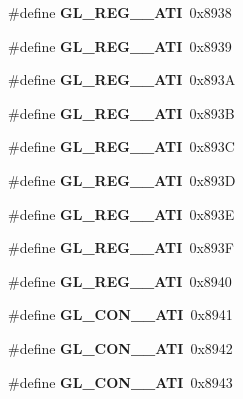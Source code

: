 \begin{DoxyCompactItemize}
\item 
\#define {\bfseries G\+L\+\_\+\+R\+E\+G\+\_\+\_\+\+A\+T\+I}~0x8938\label{_s_d_l__opengl_8h_ae01296918010a0e8a4b507a4cdc7c47d}

\item 
\#define {\bfseries G\+L\+\_\+\+R\+E\+G\+\_\+\_\+\+A\+T\+I}~0x8939\label{_s_d_l__opengl_8h_ad54d4bda4fbc2921b3b6a5edc2f892a5}

\item 
\#define {\bfseries G\+L\+\_\+\+R\+E\+G\+\_\+\_\+\+A\+T\+I}~0x893\+A\label{_s_d_l__opengl_8h_ad2f7149bedb32fce1ad327f3b29abd8a}

\item 
\#define {\bfseries G\+L\+\_\+\+R\+E\+G\+\_\+\_\+\+A\+T\+I}~0x893\+B\label{_s_d_l__opengl_8h_a759fc50e45485d9a429cd78b9d00f6ec}

\item 
\#define {\bfseries G\+L\+\_\+\+R\+E\+G\+\_\+\_\+\+A\+T\+I}~0x893\+C\label{_s_d_l__opengl_8h_a0f69fef5f8fda7c806f9e68c331061e1}

\item 
\#define {\bfseries G\+L\+\_\+\+R\+E\+G\+\_\+\_\+\+A\+T\+I}~0x893\+D\label{_s_d_l__opengl_8h_af1ac47908ee1b0a768fba8846f8ea5e0}

\item 
\#define {\bfseries G\+L\+\_\+\+R\+E\+G\+\_\+\_\+\+A\+T\+I}~0x893\+E\label{_s_d_l__opengl_8h_ab4de460868303a22a3b9e5434f5783f6}

\item 
\#define {\bfseries G\+L\+\_\+\+R\+E\+G\+\_\+\_\+\+A\+T\+I}~0x893\+F\label{_s_d_l__opengl_8h_a2fc698741bc630108429ac4fa4a22f29}

\item 
\#define {\bfseries G\+L\+\_\+\+R\+E\+G\+\_\+\_\+\+A\+T\+I}~0x8940\label{_s_d_l__opengl_8h_ac6a92fe32cc0fe7600649cbd9731e016}

\item 
\#define {\bfseries G\+L\+\_\+\+C\+O\+N\+\_\+\_\+\+A\+T\+I}~0x8941\label{_s_d_l__opengl_8h_aa586154013e00b150a1bb2bb5cfcbe05}

\item 
\#define {\bfseries G\+L\+\_\+\+C\+O\+N\+\_\+\_\+\+A\+T\+I}~0x8942\label{_s_d_l__opengl_8h_a2f12ee6ab907f3155cc4c932ea9d6bfe}

\item 
\#define {\bfseries G\+L\+\_\+\+C\+O\+N\+\_\+\_\+\+A\+T\+I}~0x8943\label{_s_d_l__opengl_8h_a730a7118709f550abceba59113a4c4ae}


\end{DoxyCompactItemize}

